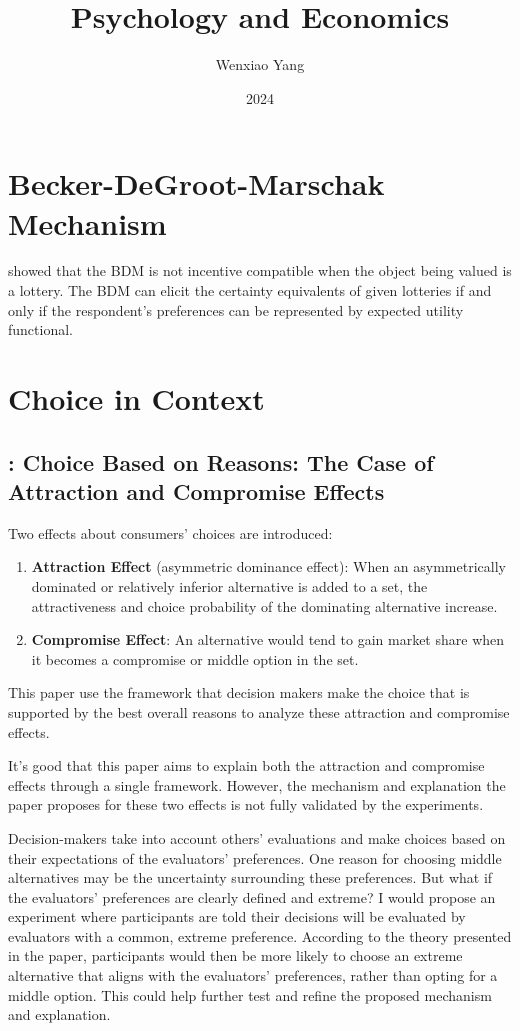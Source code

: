 \documentclass[11pt]{elegantbook}
\title{Psychology and Economics}
\author{Wenxiao Yang}
\institute{Haas School of Business, University of California Berkeley}
\date{2024}
\begin{document}
\maketitle

\frontmatter
\tableofcontents

\mainmatter



\chapter{Becker-DeGroot-Marschak Mechanism}
\cite{karni1987preference} showed that the BDM is not incentive compatible when the object being valued is a lottery. The BDM can elicit the certainty equivalents of given lotteries if and only if the respondent's preferences can be represented by expected utility functional.


\chapter{Choice in Context}
\section{\cite{simonson1989choice}: Choice Based on Reasons: The Case of Attraction and Compromise Effects}
Two effects about consumers' choices are introduced:
\begin{enumerate}
    \item \textbf{Attraction Effect} (asymmetric dominance effect): When an asymmetrically dominated or relatively inferior alternative is added to a set, the attractiveness and choice probability of the dominating alternative increase.
    \item \textbf{Compromise Effect}: An alternative would tend to gain market share when it becomes a compromise or middle option in the set.
\end{enumerate}
This paper use the framework that decision makers make the choice that is supported by the best overall reasons to analyze these attraction and compromise effects.

It’s good that this paper aims to explain both the attraction and compromise effects through a single framework. However, the mechanism and explanation the paper proposes for these two effects is not fully validated by the experiments.

Decision-makers take into account others’ evaluations and make choices based on their expectations of the evaluators’ preferences. One reason for choosing middle alternatives may be the uncertainty surrounding these preferences. But what if the evaluators’ preferences are clearly defined and extreme? I would propose an experiment where participants are told their decisions will be evaluated by evaluators with a common, extreme preference. According to the theory presented in the paper, participants would then be more likely to choose an extreme alternative that aligns with the evaluators’ preferences, rather than opting for a middle option. This could help further test and refine the proposed mechanism and explanation.
\end{document}
